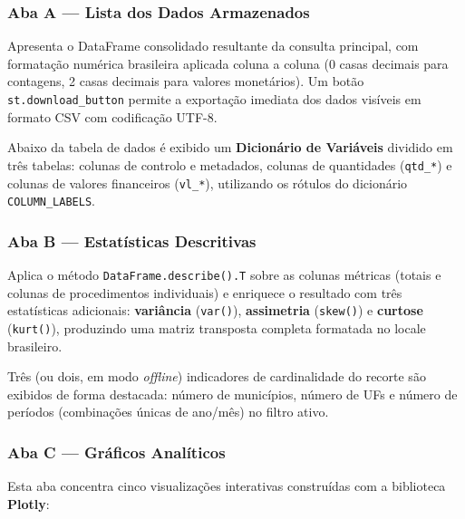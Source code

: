 \documentclass[12pt,a4paper]{report}
\begin{document}
\subsubsection*{Aba A — Lista dos Dados Armazenados}

Apresenta o DataFrame consolidado resultante da consulta principal, com formatação
numérica brasileira aplicada coluna a coluna (0 casas decimais para contagens,
2 casas decimais para valores monetários). Um botão \texttt{st.download\_button}
permite a exportação imediata dos dados visíveis em formato CSV com codificação UTF-8.

Abaixo da tabela de dados é exibido um \textbf{Dicionário de Variáveis} dividido em
três tabelas: colunas de controlo e metadados, colunas de quantidades (\texttt{qtd\_*})
e colunas de valores financeiros (\texttt{vl\_*}), utilizando os rótulos do dicionário
\texttt{COLUMN\_LABELS}.

\subsubsection*{Aba B — Estatísticas Descritivas}

Aplica o método \texttt{DataFrame.describe().T} sobre as colunas métricas (totais e
colunas de procedimentos individuais) e enriquece o resultado com três estatísticas
adicionais: \textbf{variância} (\texttt{var()}), \textbf{assimetria}
(\texttt{skew()}) e \textbf{curtose} (\texttt{kurt()}), produzindo uma matriz
transposta completa formatada no locale brasileiro.

Três (ou dois, em modo \textit{offline}) indicadores de cardinalidade do recorte são
exibidos de forma destacada: número de municípios, número de UFs e número de períodos
(combinações únicas de ano/mês) no filtro ativo.

\subsubsection*{Aba C — Gráficos Analíticos}

Esta aba concentra cinco visualizações interativas construídas com a biblioteca
\textbf{Plotly}:
\end{document}
